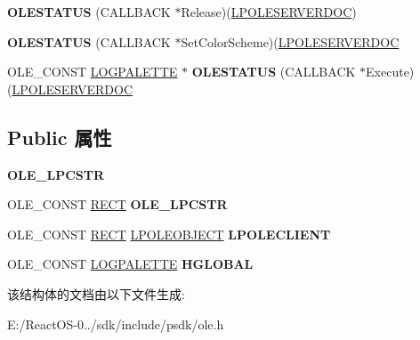 \begin{DoxyCompactItemize}
\item 
\mbox{\label{struct___o_l_e_s_e_r_v_e_r_d_o_c_v_t_b_l_a19dd649a8301ee85319d32807f496f53}} 
{\bfseries O\+L\+E\+S\+T\+A\+T\+US} (C\+A\+L\+L\+B\+A\+CK $\ast$Release)(\hyperlink{struct___o_l_e_s_e_r_v_e_r_d_o_c}{L\+P\+O\+L\+E\+S\+E\+R\+V\+E\+R\+D\+OC})
\item 
\mbox{\label{struct___o_l_e_s_e_r_v_e_r_d_o_c_v_t_b_l_a4661fae06c8d67d82589b1c0c6ff9d7a}} 
{\bfseries O\+L\+E\+S\+T\+A\+T\+US} (C\+A\+L\+L\+B\+A\+CK $\ast$Set\+Color\+Scheme)(\hyperlink{struct___o_l_e_s_e_r_v_e_r_d_o_c}{L\+P\+O\+L\+E\+S\+E\+R\+V\+E\+R\+D\+OC}
\item 
\mbox{\label{struct___o_l_e_s_e_r_v_e_r_d_o_c_v_t_b_l_a6bf43e8e3f3a784e5f4fbb6a1fea082f}} 
O\+L\+E\+\_\+\+C\+O\+N\+ST \hyperlink{structtag_l_o_g_p_a_l_e_t_t_e}{L\+O\+G\+P\+A\+L\+E\+T\+TE} $\ast$ {\bfseries O\+L\+E\+S\+T\+A\+T\+US} (C\+A\+L\+L\+B\+A\+CK $\ast$Execute)(\hyperlink{struct___o_l_e_s_e_r_v_e_r_d_o_c}{L\+P\+O\+L\+E\+S\+E\+R\+V\+E\+R\+D\+OC}
\end{DoxyCompactItemize}
\subsection*{Public 属性}
\begin{DoxyCompactItemize}
\item 
\mbox{\label{struct___o_l_e_s_e_r_v_e_r_d_o_c_v_t_b_l_a378991560c288159f147ee2c68f4b75b}} 
{\bfseries O\+L\+E\+\_\+\+L\+P\+C\+S\+TR}
\item 
\mbox{\label{struct___o_l_e_s_e_r_v_e_r_d_o_c_v_t_b_l_a68e3476825970ab0c13eb16b0f2d03e9}} 
O\+L\+E\+\_\+\+C\+O\+N\+ST \hyperlink{structtag_r_e_c_t}{R\+E\+CT} {\bfseries O\+L\+E\+\_\+\+L\+P\+C\+S\+TR}
\item 
\mbox{\label{struct___o_l_e_s_e_r_v_e_r_d_o_c_v_t_b_l_afbfb04f620b96c3091a36d739ca41d1e}} 
O\+L\+E\+\_\+\+C\+O\+N\+ST \hyperlink{structtag_r_e_c_t}{R\+E\+CT} \hyperlink{struct___o_l_e_o_b_j_e_c_t}{L\+P\+O\+L\+E\+O\+B\+J\+E\+CT} {\bfseries L\+P\+O\+L\+E\+C\+L\+I\+E\+NT}
\item 
\mbox{\label{struct___o_l_e_s_e_r_v_e_r_d_o_c_v_t_b_l_a9a0763797795cbfc8ad77581998a5a03}} 
O\+L\+E\+\_\+\+C\+O\+N\+ST \hyperlink{structtag_l_o_g_p_a_l_e_t_t_e}{L\+O\+G\+P\+A\+L\+E\+T\+TE} {\bfseries H\+G\+L\+O\+B\+AL}
\end{DoxyCompactItemize}


该结构体的文档由以下文件生成\+:\begin{DoxyCompactItemize}
\item 
E\+:/\+React\+O\+S-\/0../sdk/include/psdk/ole.\+h\end{DoxyCompactItemize}
